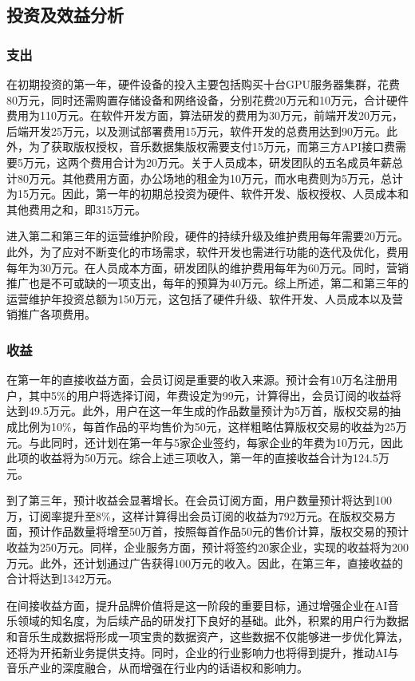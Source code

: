 \documentclass{base}
\begin{document}
\subsection{投资及效益分析}

\subsubsection{支出}

在初期投资的第一年，硬件设备的投入主要包括购买十台GPU服务器集群，花费80万元，同时还需购置存储设备和网络设备，分别花费20万元和10万元，合计硬件费用为110万元。在软件开发方面，算法研发的费用为30万元，前端开发20万元，后端开发25万元，以及测试部署费用15万元，软件开发的总费用达到90万元。此外，为了获取版权授权，音乐数据集版权需要支付15万元，而第三方API接口费需要5万元，这两个费用合计为20万元。关于人员成本，研发团队的五名成员年薪总计80万元。其他费用方面，办公场地的租金为10万元，而水电费则为5万元，总计为15万元。因此，第一年的初期总投资为硬件、软件开发、版权授权、人员成本和其他费用之和，即315万元。

进入第二和第三年的运营维护阶段，硬件的持续升级及维护费用每年需要20万元。此外，为了应对不断变化的市场需求，软件开发也需进行功能的迭代及优化，费用每年为30万元。在人员成本方面，研发团队的维护费用每年为60万元。同时，营销推广也是不可或缺的一项支出，每年的预算为40万元。综上所述，第二和第三年的运营维护年投资总额为150万元，这包括了硬件升级、软件开发、人员成本以及营销推广各项费用。

\subsubsection{收益}
在第一年的直接收益方面，会员订阅是重要的收入来源。预计会有10万名注册用户，其中5\%的用户将选择订阅，年费设定为99元，计算得出，会员订阅的收益将达到49.5万元。此外，用户在这一年生成的作品数量预计为5万首，版权交易的抽成比例为10\%，每首作品的平均售价为50元，这样粗略估算版权交易的收益为25万元。与此同时，还计划在第一年与5家企业签约，每家企业的年费为10万元，因此此项的收益将为50万元。综合上述三项收入，第一年的直接收益合计为124.5万元。

到了第三年，预计收益会显著增长。在会员订阅方面，用户数量预计将达到100万，订阅率提升至8\%，这样计算得出会员订阅的收益为792万元。在版权交易方面，预计作品数量将增至50万首，按照每首作品50元的售价计算，版权交易的预计收益为250万元。同样，企业服务方面，预计将签约20家企业，实现的收益将为200万元。此外，还计划通过广告获得100万元的收入。因此，在第三年，直接收益的合计将达到1342万元。

在间接收益方面，提升品牌价值将是这一阶段的重要目标，通过增强企业在AI音乐领域的知名度，为后续产品的研发打下良好的基础。此外，积累的用户行为数据和音乐生成数据将形成一项宝贵的数据资产，这些数据不仅能够进一步优化算法，还将为开拓新业务提供支持。同时，企业的行业影响力也将得到提升，推动AI与音乐产业的深度融合，从而增强在行业内的话语权和影响力。
\end{document}
